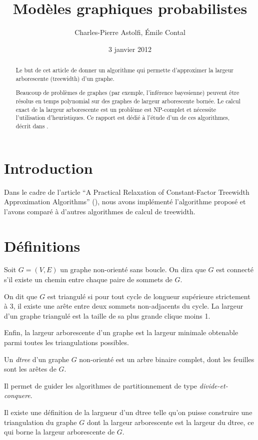 \documentclass{article}
\title{Modèles graphiques probabilistes}
\author{Charles-Pierre Astolfi, Émile Contal}
\date{3 janvier 2012}
\begin{document}
\maketitle

\begin{abstract}
Le but de cet article de donner un algorithme qui permette
d'approximer la largeur arborescente (treewidth) d'un graphe.

Beaucoup de problèmes de graphes (par exemple, l'inférence bayesienne)
peuvent être résolus en temps polynomial sur des graphes de largeur
arborescente bornée. Le calcul exact de la largeur arborescente est un
problème est NP-complet et nécessite l'utilisation d'heuristiques. Ce
rapport est dédié à l'étude d'un de ces algorithmes, décrit dans
\cite{rootpaper}.

\end{abstract}

\section{Introduction}
Dans le cadre de l'article ``A Practical Relaxation of Constant-Factor
Treewidth Approximation Algorithms'' (\cite{rootpaper}), nous avons
implémenté l'algorithme proposé et l'avons comparé à d'autres
algorithmes de calcul de treewidth.


\section{Définitions}

Soit $G = (V,E)$ un graphe non-orienté sans boucle. On dira que $G$
est connecté s'il existe un chemin entre chaque paire de sommets de
$G$.


On dit que $G$ est triangulé si pour tout cycle de longueur supérieure
strictement à 3, il existe une arête entre deux sommets non-adjacents
du cycle. La largeur d'un graphe triangulé est la taille de sa plus
grande clique moins 1.

Enfin, la largeur arborescente d'un graphe est la largeur minimale
obtenable parmi toutes les triangulations possibles.

Un \emph{dtree} d'un graphe $G$ non-orienté est un arbre binaire
complet, dont les feuilles sont les arêtes de $G$.

Il permet de guider les algorithmes de partitionnement de type
\emph{divide-et-conquere}.

Il existe une définition de la largueur d'un dtree telle qu'on puisse
construire une triangulation du graphe $G$ dont la largeur
arborescente est la largeur du dtree, ce qui borne la largeur
arborescente de $G$.
\end{document}

